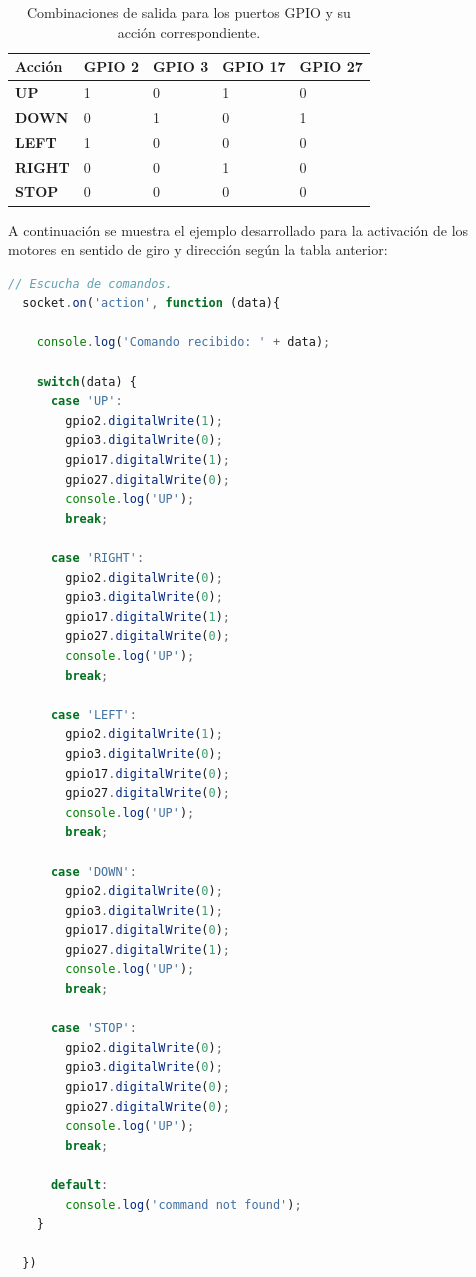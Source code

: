 \begin{table}[H]
  \begin{center}
    \begin{tabular}{|p{2.5cm}|p{2.5cm}|p{2.5cm}|p{2.5cm}|p{2.5cm}|}
      \hline
      {\textbf{Acción}} & \textbf{ GPIO 2 } & \textbf{ GPIO 3 } & \textbf{  GPIO 17 } & \textbf{ GPIO 27 }\\
      \hline
      { \textbf{ UP } } & { 1 } & { 0 }  & { 1 }  & { 0 }  \\
      \hline
      { \textbf{ DOWN } } & { 0 } & { 1 }  & { 0 }  & { 1 } \\
      \hline
      { \textbf{ LEFT } } & { 1 } & { 0 }  & { 0 }  & { 0 } \\
      \hline
      { \textbf{ RIGHT } } & { 0 } & { 0 }  & { 1 }  & { 0 } \\
      \hline
      { \textbf{ STOP } } & { 0 } & { 0 }  & { 0 }  & { 0 }  \\
     \hline   
    \end{tabular}
  \end{center}
\caption{ Combinaciones de salida para los puertos GPIO y su acción correspondiente. }
\label{table:table-pin-out}
\end{table}

A continuación se muestra el ejemplo desarrollado para la activación de los motores en sentido de giro y dirección según la tabla anterior:\\

\begin{lstlisting}[language=JavaScript]
  // Escucha de comandos.  
  socket.on('action', function (data){

    console.log('Comando recibido: ' + data);

    switch(data) {
      case 'UP':
        gpio2.digitalWrite(1);
        gpio3.digitalWrite(0);
        gpio17.digitalWrite(1);
        gpio27.digitalWrite(0);
        console.log('UP');
        break;

      case 'RIGHT':
        gpio2.digitalWrite(0);
        gpio3.digitalWrite(0);
        gpio17.digitalWrite(1);
        gpio27.digitalWrite(0);
        console.log('UP');
        break;

      case 'LEFT':
        gpio2.digitalWrite(1);
        gpio3.digitalWrite(0);
        gpio17.digitalWrite(0);
        gpio27.digitalWrite(0);
        console.log('UP');
        break;

      case 'DOWN':
        gpio2.digitalWrite(0);
        gpio3.digitalWrite(1);
        gpio17.digitalWrite(0);
        gpio27.digitalWrite(1);
        console.log('UP');
        break;

      case 'STOP':
        gpio2.digitalWrite(0);
        gpio3.digitalWrite(0);
        gpio17.digitalWrite(0);
        gpio27.digitalWrite(0);
        console.log('UP');
        break;

      default:
        console.log('command not found');
    }

  })
    
\end{lstlisting}



